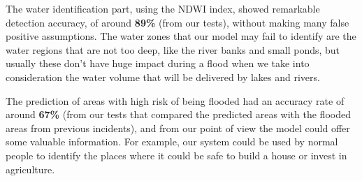 \documentclass[12pt, a4paper]{report}
\begin{document}
The water identification part, using the NDWI index, showed remarkable detection accuracy, of around \textbf{89\%} (from our tests), without making many false positive assumptions. The water zones that our model may fail to identify are the water regions that are not too deep, like the river banks and small ponds, but usually these don't have huge impact during a flood when we take into consideration the water volume that will be delivered by lakes and rivers.
\par 

The prediction of areas with high risk of being flooded had an accuracy rate of around \textbf{67\%} (from our tests that compared the predicted areas with the flooded areas from previous incidents), and from our point of view the model could offer some valuable information. For example, our system could be used by normal people to identify the places where it could be safe to build a house or invest in agriculture.




\renewcommand{\bibname}{Bibliography}

\end{document}
